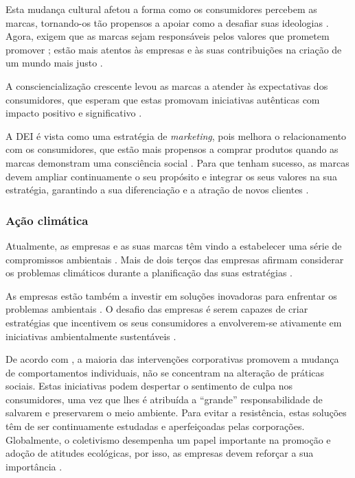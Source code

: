 \documentclass[portuguese]{textolivre}
\begin{document}
Esta mudança cultural afetou a forma como os consumidores percebem as marcas, tornando-os tão propensos a apoiar como a desafiar suas ideologias \cite{ferraro_embracing_2023}. Agora, exigem que as marcas sejam responsáveis pelos valores que prometem promover \cite{ferraro_embracing_2023}; estão mais atentos às empresas e às suas contribuições na criação de um mundo mais justo \cite{human_human_2022}.

A consciencialização crescente levou as marcas a atender às expectativas dos consumidores, que esperam que estas promovam iniciativas autênticas com impacto positivo e significativo \cite{ferraro_embracing_2023}.

A DEI é vista como uma estratégia de \textit{marketing}, pois melhora o relacionamento com os consumidores, que estão mais propensos a comprar produtos quando as marcas demonstram uma consciência social \cite{human_human_2022}. Para que tenham sucesso, as marcas devem ampliar continuamente o seu propósito e integrar os seus valores na sua estratégia, garantindo a sua diferenciação e a atração de novos clientes \cite{human_human_2022}.

\subsubsection{Ação climática}\label{sec-organizacao-latex}
Atualmente, as empresas e as suas marcas têm vindo a estabelecer uma série de compromissos ambientais \cite{salnikova_engaging_2022}. Mais de dois terços das empresas afirmam considerar os problemas climáticos durante a planificação das suas estratégias \cite{lambin_global_2020}.

As empresas estão também a investir em soluções inovadoras para enfrentar os problemas ambientais \cite{berkowitz_most_2021}. O desafio das empresas é serem capazes de criar estratégias que incentivem os seus consumidores a envolverem-se ativamente em iniciativas ambientalmente sustentáveis \cite{salnikova_engaging_2022}.

De acordo com \textcite{gonzalez-arcos_how_2021}, a maioria das intervenções corporativas promovem a mudança de comportamentos individuais, não se concentram na alteração de práticas sociais. Estas iniciativas podem despertar o sentimento de culpa nos consumidores, uma vez que lhes é atribuída a “grande” responsabilidade de salvarem e preservarem o meio ambiente. Para evitar a resistência, estas soluções têm de ser continuamente estudadas e aperfeiçoadas pelas corporações. Globalmente, o coletivismo desempenha um papel importante na promoção e adoção de atitudes ecológicas, por isso, as empresas devem reforçar a sua importância \cite{leonidou_consumers_2022}.
\end{document}
